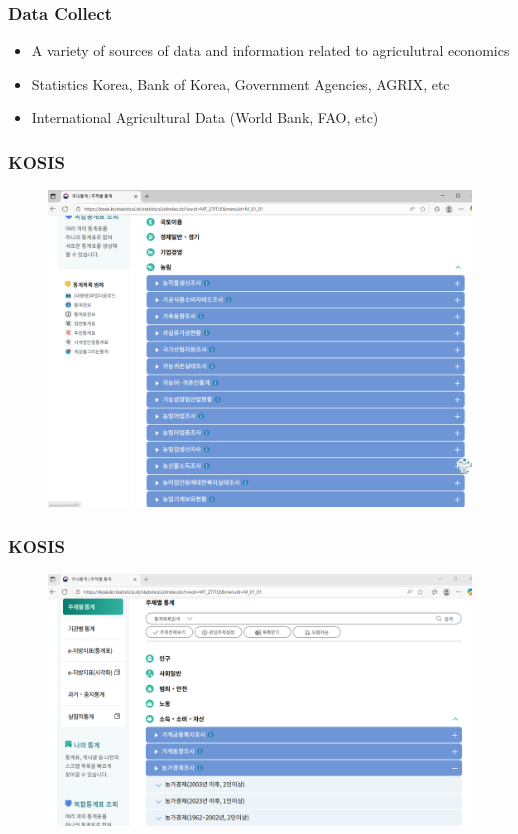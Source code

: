 \documentclass[
	11pt, %
]{beamer}
\begin{document}
\begin{frame}
	\frametitle{Data Collect}
		\begin{itemize}
			\item A variety of sources of data and information related to agriculutral economics
			\item Statistics Korea, Bank of Korea, Government Agencies, AGRIX, etc
			\item International Agricultural Data (World Bank, FAO, etc)
		\end{itemize}
\end{frame}

\begin{frame}
	\frametitle{KOSIS}
	\begin{figure}
		\includegraphics[width=0.8\linewidth]{images/figure4.png}
		\label{fig}
	\end{figure}
\end{frame}


\begin{frame}
	\frametitle{KOSIS}
	\begin{figure}
		\includegraphics[width=0.8\linewidth]{images/figure5.png}
		\label{fig}
	\end{figure}
\end{frame}
\end{document}
